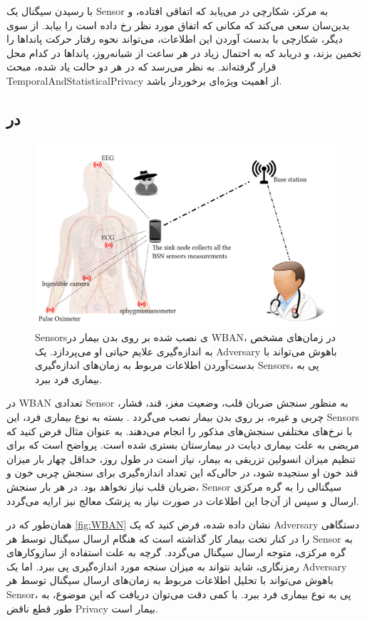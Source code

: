 با رسیدن سیگنال یک \gls{Sensor} به مرکز، شکارچی در می‌یابد که اتفاقی افتاده، و بدین‌سان سعی می‌کند که مکانی که اتفاق مورد نظر رخ داده است را بیابد. از سوی دیگر، شکارچی با بدست آوردن این اطلاعات، می‌تواند نحوه رفتار حرکت پانداها را تخمین بزند، و دریابد که به احتمال زیاد در هر ساعت از شبانه‌روز، پانداها در کدام محل قرار گرفته‌اند. به نظر می‌رسد که در هر دو حالت یاد شده، مبحث ‎\gls{TemporalAndStatisticalPrivacy}‎ از اهمیت ویژه‌ای برخوردار باشد. 

\subsection{ در }
\begin{figure}
\includegraphics[width=0.7\linewidth]{Pic/IntroductionPics/WBAN}
\caption{
\glspl*{Sensor}ی
نصب شده بر روی بدن بیمار در 
\gls*{WBAN}،
در زمان‌های مشخص به اندازه‌گیری علایم حیاتی او می‌پردازد. یک
\gls*{Adversary}
باهوش می‌تواند با بدست‌آوردن اطلاعات مربوط به زمان‌های اندازه‌گیری 
\glspl*{Sensor}،
پی به بیماری فرد ببرد.
}
\label{fig:WBAN}
\end{figure}
در 
\gls{WBAN} تعدادی \gls{Sensor} 
به منظور سنجش ضربان قلب، وضعیت مغز، قند، فشار، چربی و غیره، بر روی بدن بیمار  نصب می‌گردد
\cite{ullah2012comprehensive}.
بسته به نوع بیماری فرد، این 
\glspl{Sensor}
با نرخ‌های مختلفی سنجش‌های مذکور را انجام می‌دهند. به عنوان مثال فرض کنید که مریضی به علت بیماری دیابت در بیمارستان بستری شده است. پرواضح است که برای تنظیم میزان انسولین تزریقی به بیمار، نیاز است در طول روز، حداقل چهار بار میزان قند خون او سنجیده شود، در حالی‌که این تعداد اندازه‌گیری  برای سنجش چربی خون و ضربان قلب نیاز نخواهد بود. در هر بار سنجش،
\gls{Sensor}
سیگنالی را به گره مرکزی ارسال و سپس از آن‌جا این اطلاعات در صورت نیاز به پزشک معالج نیز ارایه می‌گردد.

همان‌طور که در
\autoref{fig:WBAN}
نشان داده شده، فرض کنید که یک
\gls{Adversary}
دستگاهی را در کنار تخت بیمار کار گذاشته است که هنگام ارسال سیگنال توسط هر 
\gls{Sensor}
به گره مرکزی، متوجه ارسال سیگنال می‌گردد. گرچه به علت استفاده از سازوکارهای رمزنگاری، شاید نتواند به میزان سنجه مورد اندازه‌گیری پی ببرد. اما یک
\gls{Adversary}
باهوش می‌تواند با تحلیل اطلاعات مربوط به زمان‌های ارسال سیگنال توسط هر 
\gls{Sensor}،
پی به نوع بیماری فرد ببرد. با کمی دقت می‌توان دریافت که این موضوع، به طور قطع ناقض 
\gls{Privacy}
بیمار است. 



